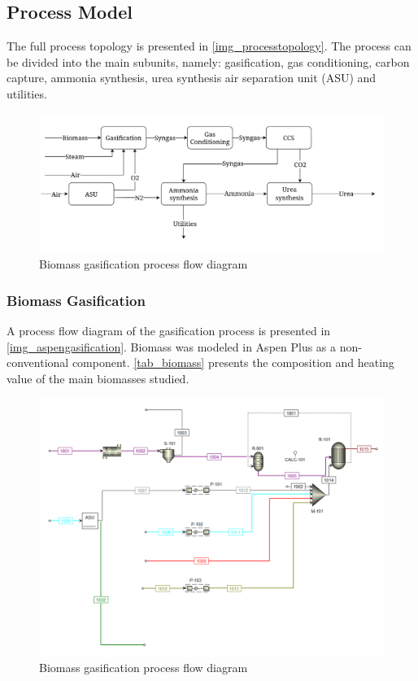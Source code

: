 \documentclass[a4paper, titlepage]{article}
\begin{document}
\subsection{Process Model}

The full process topology is presented in \autoref{img_processtopology}. The process can be divided into the main
subunits, namely: gasification, gas conditioning, carbon capture, ammonia synthesis, urea synthesis air separation unit
(ASU) and utilities.

\begin{figure}[htb]
    \includegraphics[width=\textwidth]{img/process_topology.png}
    \caption{Biomass gasification process flow diagram}
    \label{img_processtopology}
\end{figure}

\subsubsection{Biomass Gasification}

A process flow diagram of the gasification process is presented in \autoref{img_aspengasification}. Biomass was modeled
in Aspen Plus as a non-conventional component. \autoref{tab_biomass} presents the composition and heating value
of the main biomasses studied.

\begin{figure}[htb]
    \includegraphics[width=\textwidth]{img/aspen_gasification.png}
    \caption{Biomass gasification process flow diagram}
    \label{img_aspengasification}
\end{figure}
\end{document}
